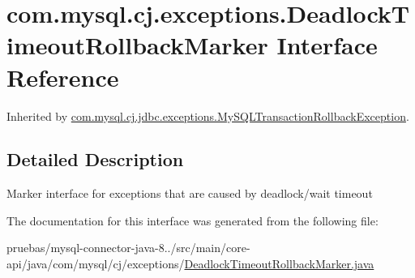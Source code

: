 \hypertarget{interfacecom_1_1mysql_1_1cj_1_1exceptions_1_1_deadlock_timeout_rollback_marker}{}\section{com.\+mysql.\+cj.\+exceptions.\+Deadlock\+Timeout\+Rollback\+Marker Interface Reference}
\label{interfacecom_1_1mysql_1_1cj_1_1exceptions_1_1_deadlock_timeout_rollback_marker}


Inherited by \mbox{\hyperlink{classcom_1_1mysql_1_1cj_1_1jdbc_1_1exceptions_1_1_my_s_q_l_transaction_rollback_exception}{com.\+mysql.\+cj.\+jdbc.\+exceptions.\+My\+S\+Q\+L\+Transaction\+Rollback\+Exception}}.



\subsection{Detailed Description}
Marker interface for exceptions that are caused by deadlock/wait timeout 

The documentation for this interface was generated from the following file\+:\begin{DoxyCompactItemize}
\item 
pruebas/mysql-\/connector-\/java-\/8../src/main/core-\/api/java/com/mysql/cj/exceptions/\mbox{\hyperlink{_deadlock_timeout_rollback_marker_8java}{Deadlock\+Timeout\+Rollback\+Marker.\+java}}\end{DoxyCompactItemize}
